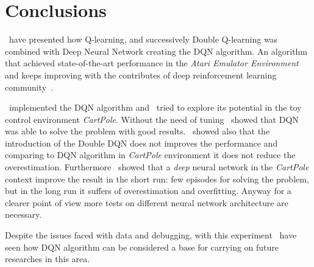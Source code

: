 \section{Conclusions}

\Auth~have presented how Q-learning, and successively Double Q-learning was combined with Deep Neural Network creating the DQN algorithm. 
An algorithm that achieved state-of-the-art performance in the \textit{Atari Emulator Environment} and keeps improving with the contributes of deep reinforcement learning community~\cite{DBLP:journals/corr/abs-1710-02298}.

\Auth~implemented the DQN algorithm and \auth~tried to explore its potential in the toy control environment \textit{CartPole}. Without the need of tuning \auth~showed that DQN was able to solve the problem with good results. \Auth~showed also that the introduction of the Double DQN does not improves the performance and comparing to DQN algorithm in \textit{CartPole} environment it does not reduce the overestimation. Furthermore \Auth~showed that a \textit{deep} neural network in the \textit{CartPole} context improve the result in the short run: few episodes for solving the problem, but in the long run it suffers of overestimation and overfitting. Anyway for a clearer point of view more tests on different neural network architecture are necessary.

Despite the issues faced with data and debugging, with this experiment \auth~have seen how DQN algorithm can be considered a base for carrying on future researches in this area. 